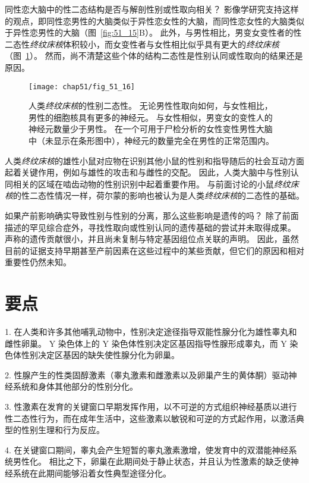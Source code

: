 同性恋大脑中的性二态结构是否与解剖性别或性取向相关？
影像学研究支持这样的观点，即同性恋男性的大脑类似于异性恋女性的大脑，而同性恋女性的大脑类似于异性恋男性的大脑（图~\ref{fig:51_15}B）。
此外，与男性相比，男变女变性者的性二态性\textit{终纹床核}体积较小，而女变性者与女性相比似乎具有更大的\textit{终纹床核}（图~\ref{fig:51_16}）。
然而，尚不清楚这些个体的结构二态性是性别认同或性取向的结果还是原因。


\begin{figure}[htbp]
	\centering
	\texttt{[image: chap51/fig\_51\_16]}
	\caption{人类\textit{终纹床核}的性别二态性。
		无论男性性取向如何，与女性相比，男性的细胞核具有更多的神经元。
		与女性相似，男变女的变性人的神经元数量少于男性。
		在一个可用于尸检分析的女性变性男性大脑中（未显示在条形图中），神经元的数量完全在男性的正常范围内\cite{kruijver2000male}。}
	\label{fig:51_16}
\end{figure}


人类\textit{终纹床核}的雄性小鼠对应物在识别其他小鼠的性别和指导随后的社会互动方面起着关键作用，例如与雄性的攻击和与雌性的交配。
因此，人类大脑中与性别认同相关的区域在啮齿动物的性别识别中起着重要作用。
与前面讨论的小鼠\textit{终纹床核}的性二态性情况一样，荷尔蒙的影响也被认为是人类\textit{终纹床核}的二态性的基础。


如果产前影响确实导致性别与性别的分离，那么这些影响是遗传的吗？
除了前面描述的罕见综合症外，寻找性取向或性别认同的遗传基础的尝试并未取得成果。
声称的遗传贡献很小，并且尚未复制与特定基因组位点关联的声明。
因此，虽然目前的证据支持早期甚至产前因素在这些过程中的某些贡献，但它们的原因和相对重要性仍然未知。


\section{要点}

1. 在人类和许多其他哺乳动物中，性别决定途径指导双能性腺分化为雄性睾丸和雌性卵巢。
Y 染色体上的 Y 染色体性别决定区基因指导性腺形成睾丸，而 Y 染色体性别决定区基因的缺失使性腺分化为卵巢。


2. 性腺产生的性类固醇激素（睾丸激素和雌激素以及卵巢产生的黄体酮）驱动神经系统和身体其他部分的性别分化。


3. 性激素在发育的关键窗口早期发挥作用，以不可逆的方式组织神经基质以进行性二态性行为，而在成年生活中，这些激素以敏锐和可逆的方式起作用，以激活典型的性别生理和行为反应。


4. 在关键窗口期间，睾丸会产生短暂的睾丸激素激增，使发育中的双潜能神经系统男性化。
相比之下，卵巢在此期间处于静止状态，并且认为性激素的缺乏使神经系统在此期间能够沿着女性典型途径分化。


